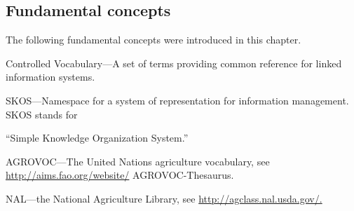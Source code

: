 \subsection{Fundamental concepts}

The following fundamental concepts were introduced in this chapter.

Controlled Vocabulary---A set of terms providing common reference for
linked information systems.

SKOS---Namespace for a system of representation for information
management. SKOS stands for

``Simple Knowledge Organization System.''

AGROVOC---The United Nations agriculture vocabulary, see
\url{http://aims.fao.org/website/} AGROVOC-Thesaurus.

NAL---the National Agriculture Library, see
\href{http://agclass.nal.usda.gov/}{http://agclass.nal.usda.gov/.}
